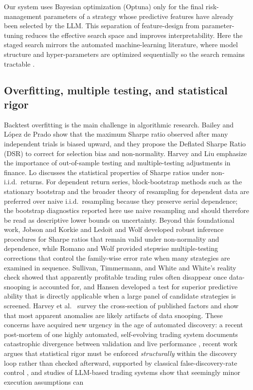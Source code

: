 \documentclass[analytics,article,submit,pdftex,moreauthors]{Definitions/mdpi}
\begin{document}
Our system uses Bayesian optimization (Optuna) only for the final risk-management parameters of a strategy whose predictive features have already been selected by the LLM. This separation of feature-design from parameter-tuning reduces the effective search space and improves interpretability. Here the staged search mirrors the automated machine-learning literature, where model structure and hyper-parameters are optimized sequentially so the search remains tractable \citep{hutter_2019}.

\subsection{Overfitting, multiple testing, and statistical rigor}\label{overfitting-multiple-testing-and-statistical-rigor}

Backtest overfitting is the main challenge in algorithmic research. Bailey and L\'{o}pez de Prado \citep{bailey_2014} show that the maximum Sharpe ratio observed after many independent trials is biased upward, and they propose the Deflated Sharpe Ratio (DSR) to correct for selection bias and non-normality. Harvey and Liu \citep{harvey_2015} emphasize the importance of out-of-sample testing and multiple-testing adjustments in finance. Lo \citep{lo_2002} discusses the statistical properties of Sharpe ratios under non-i.i.d.~returns. For dependent return series, block-bootstrap methods such as the stationary bootstrap \citep{politis_romano_1994} and the broader theory of resampling for dependent data \citep{lahiri_2003} are preferred over naive i.i.d.~resampling because they preserve serial dependence; the bootstrap diagnostics reported here use naive resampling and should therefore be read as descriptive lower bounds on uncertainty. Beyond this foundational work, Jobson and Korkie \citep{jobson_1981} and Ledoit and Wolf \citep{ledoit_2008} developed robust inference procedures for Sharpe ratios that remain valid under non-normality and dependence, while Romano and Wolf \citep{romano_2005} provided stepwise multiple-testing corrections that control the family-wise error rate when many strategies are examined in sequence. Sullivan, Timmermann, and White \citep{sullivan_1999, sullivan_2001} and White's \citep{white_2000} reality check showed that apparently profitable trading rules often disappear once data-snooping is accounted for, and Hansen \citep{hansen_2005} developed a test for superior predictive ability that is directly applicable when a large panel of candidate strategies is screened. Harvey et al.~\citep{harvey_2016} survey the cross-section of published factors and show that most apparent anomalies are likely artifacts of data snooping. These concerns have acquired new urgency in the age of automated discovery: a recent post-mortem of one highly automated, self-evolving trading system documents catastrophic divergence between validation and live performance \citep{chen_2025_redqueen}, recent work argues that statistical rigor must be enforced \emph{structurally} within the discovery loop rather than checked afterward, supported by classical false-discovery-rate control \citep{benjamini_hochberg_1995}, and studies of LLM-based trading systems show that seemingly minor execution assumptions can 
\end{document}
